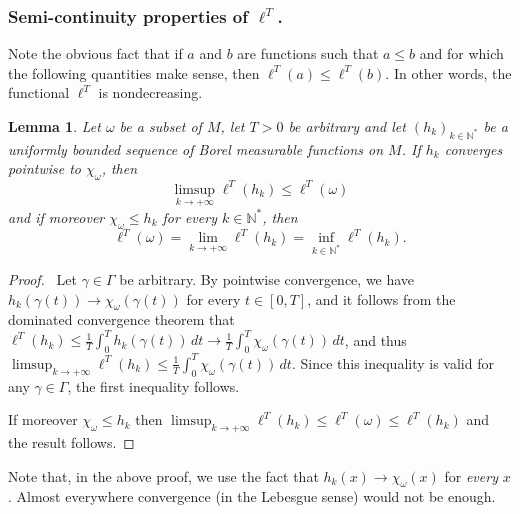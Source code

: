 \documentclass[10pt]{amsart}
\def\N{\mathbb{N}}
\newtheorem{lemma}{Lemma}
\theoremstyle{definition}
\begin{document}
\subsubsection*{Semi-continuity properties of $\ell^T$.}
Note the obvious fact that if $a$ and $b$ are functions such that $a\leq b$ and for which the following quantities make sense, then $\ell^T(a)\leq \ell^T(b)$. In other words, the functional $\ell^T$ is nondecreasing.

\begin{lemma}\label{lemBorel}
Let $\omega$ be a subset of $M$, let $T>0$ be arbitrary and let $(h_k)_{k\in\N^*}$ be a uniformly bounded sequence of Borel measurable functions on $M$.
If $h_k$ converges pointwise to $\chi_\omega$, then
\[
\limsup_{k\rightarrow +\infty} \ell^T(h_k)\leq \ell^T(\omega)
\]
and if moreover $\chi_{\omega}\leq h_k$ for every $k\in\N^*$, then
\[
\ell^T(\omega) = \lim_{k\rightarrow +\infty} \ell^T(h_k) = \inf_{k\in\N^*} \ell^T(h_k).
\]
\end{lemma}

\begin{proof}\
Let $\gamma\in\Gamma$ be arbitrary. By pointwise convergence, we have $h_k(\gamma(t))\rightarrow\chi_\omega(\gamma(t))$ for every $t\in[0,T]$, and it follows from the dominated convergence theorem that $\ell^T(h_k)\leq \frac{1}{T} \int_0^T h_k(\gamma(t))\, dt \rightarrow \frac{1}{T} \int_0^T \chi_\omega(\gamma(t))\, dt$, and thus $\limsup_{k\rightarrow +\infty} \ell^T(h_k)\leq \frac{1}{T} \int_0^T \chi_\omega(\gamma(t))\, dt$. Since this inequality is valid for any $\gamma\in\Gamma$, the first inequality follows.

If moreover $\chi_{\omega}\leq h_k$ then $\limsup_{k\rightarrow+\infty} \ell^T(h_k)\leq \ell^T(\omega)\leq \ell^T(h_k)$ and the result follows.
\end{proof}

Note that, in the above proof, we use the fact that $h_k(x)\rightarrow\chi_\omega(x)$ for \textit{every} $x$. Almost everywhere convergence (in the Lebesgue sense) would not be enough.
\end{document}
